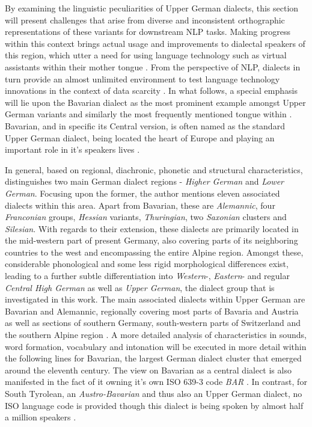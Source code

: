\documentclass[11pt,a4paper,twoside,openright]{scrbook}
\begin{document}
By examining the linguistic peculiarities of Upper German dialects, this section will present challenges that arise from diverse and inconsistent orthographic representations of these variants for downstream NLP tasks. Making progress within this context brings actual usage and improvements to dialectal speakers of this region, which utter a need for using language technology such as virtual assistants within their mother tongue \citep{blaschke2024dialectsurvey, winkler-etal-2024-slot-intent}. From the perspective of NLP, dialects in turn provide an almost unlimited environment to test language technology innovations in the context of data scarcity \citep{blaschke-etal-2023-survey}. In what follows, a special emphasis will lie upon the Bavarian dialect as the most prominent example amongst Upper German variants and similarly the most frequently mentioned tongue within \citet{blaschke2024dialectsurvey}. Bavarian, and in specific its Central version, is often named as the standard Upper German dialect, being located the heart of Europe and playing an important role in it's speakers lives \citep{VergeinerBülow+2023}.

In general, based on regional, diachronic, phonetic and structural characteristics, \citet{wiesinger1983deutschedialekte} distinguishes two main German dialect regions - \textit{Higher German} and \textit{Lower German}. Focusing upon the former, the author mentions eleven associated dialects within this area. Apart from Bavarian, these are \textit{Alemannic}, four \textit{Franconian} groups, \textit{Hessian} variants, \textit{Thuringian}, two \textit{Saxonian} clusters and \textit{Silesian}. With regards to their extension, these dialects are primarily located in the mid-western part of present Germany, also covering parts of its neighboring countries to the west and encompassing the entire Alpine region. Amongst these, considerable phonological and some less rigid morphological differences exist, leading to a further subtle differentiation into \textit{Western}-, \textit{Eastern}- and regular \textit{Central High German} as well as \textit{Upper German}, the dialect group that is investigated in this work. The main associated dialects within Upper German are Bavarian and Alemannic, regionally covering most parts of Bavaria and Austria as well as sections of southern Germany, south-western parts of Switzerland and the southern Alpine region \citep{wiesinger1983deutschedialekte, VergeinerBülow+2023}. A more detailed analysis of characteristics in sounds, word formation, vocabulary and intonation will be executed in more detail within the following lines for Bavarian, the largest German dialect cluster that emerged around the eleventh century\citep{wiesinger1983deutschedialekte}. The view on Bavarian as a central dialect is also manifested in the fact of it owning it's own ISO 639-3 code \textit{BAR} \citep{blaschke-etal-2023-survey}. In contrast, for South Tyrolean, an \textit{Austro-Bavarian} and thus also an Upper German dialect, no ISO language code is provided though this dialect is being spoken by almost half a million speakers \citep{van-der-goot-etal-2021-masked}.
\end{document}

